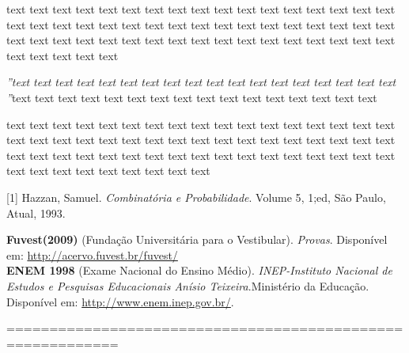 \documentclass[12pt]{exam}
\begin{document}
\begin{questions}
\begin{choices}
\end{choices}


\question[2] text text text text text text text text text text text text text text text text text text text text text text text text text text text text text text text text text text text text text text text text text text text text text text text text text text text text text text text text 

\fillwithlines{1.9 in}

\question[1] \textit{”text text text text text text text text text text text text text text text text text text ”}text text text text text text text text text text text text text text text text 

\begin{choices}

\choice text text text text text text text text text text text text
\choice text text text text text text text text text text text text 
\choice text text text text text text text text text text text text 
\choice text text text text text text text text text text text text 
\choice text text text text text text text text text text text text 

\end{choices}



\fillwithlines{1.9 in}



\end{questions}
\begin{thebibliography}{99}
\thispagestyle{empty}%
[1] {Hazzan, Samuel}.
\emph{Combinatória e Probabilidade}.
{Volume  5}, {1;ed}, {São Paulo}, {Atual}, {1993}.
		
\textbf{Fuvest(2009)}
(Fundação Universitária para o Vestibular).
\emph{Provas}. 
Disponível em:
\url{http://acervo.fuvest.br/fuvest/}\\
		
\textbf{ENEM 1998}
(Exame Nacional do Ensino Médio).
\emph{INEP-Instituto Nacional de Estudos e Pesquisas Educacionais Anísio Teixeira}.{Ministério da Educação}. 
Disponível em:
\url{http://www.enem.inep.gov.br/}.
		
===========================================================
\end{thebibliography}
\end{document}
